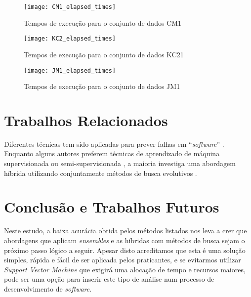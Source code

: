 \documentclass[10pt]{article}
\begin{document}
    \begin{figure}
        \centering
        \texttt{[image: CM1\_elapsed\_times]}
        \caption{Tempos de execução para o conjunto de dados CM1}\label{fig:et_cm1}
    \end{figure}

    \begin{figure}
        \centering
        \texttt{[image: KC2\_elapsed\_times]}
        \caption{Tempos de execução para o conjunto de dados KC21}\label{fig:et_kc2}
    \end{figure}

    \begin{figure}
        \centering
        \texttt{[image: JM1\_elapsed\_times]}
        \caption{Tempos de execução para o conjunto de dados JM1}\label{fig:et_jm1}
    \end{figure}

\section{Trabalhos Relacionados}

    Diferentes técnicas tem sido aplicadas para prever falhas em ``\textit{software}'' \cite{abaei_empirical_2015,abdi_hybrid_2015,chatterjee_bayesian_2018,dhanalaxmi_adaptive_2015,diwaker_prediction_2018,felix_predicting_2020,gao_effective_2017,harikarthik_optimal_2019,jayanthi_software_2019,kalsoom_dimensionality_2018,kumaresan_software_2019,mahajan_design_2015,panda_slice-based_2016,rani_neural_2018,roya_neuro-genetic_2015,vitiello_software_2019}. Enquanto alguns autores preferem técnicas de aprendizado de máquina supervisionada \cite{rani_neural_2018} ou semi-supervisionada \cite{abaei_empirical_2015}, a maioria investiga uma abordagem híbrida utilizando conjuntamente métodos de busca evolutivos \cite{abdi_hybrid_2015,anwar_hybrid-adaptive_2019,dhanalaxmi_adaptive_2015,diwaker_prediction_2018,roya_neuro-genetic_2015,shamshiriRandomEvolutionarySearch2018,sharifipourStructuralTestData2018,tianTestDataGeneration2016,varshneyHybridParticleSwarm2018,yaoConstrainedMultiobjectiveTest2015}.


\section{Conclusão e Trabalhos Futuros}

    Neste estudo, a baixa acurácia obtida pelos métodos listados nos leva a crer que abordagens que aplicam \textit{ensembles} e as híbridas com métodos de busca sejam o próximo passo lógico a seguir. Apesar disto acreditamos que esta é uma solução simples, rápida e fácil de ser aplicada pelos praticantes, e se evitarmos utilizar \textit{Support Vector Machine} que exigirá uma alocação de tempo e recursos maiores, pode ser uma opção para inserir este tipo de análise num processo de desenvolvimento de \textit{software}.
\end{document}
